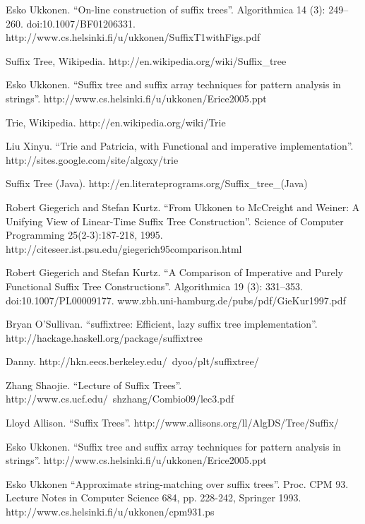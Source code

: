 \documentclass{article}
\begin{document}
\begin{thebibliography}{99}

Esko Ukkonen. ``On-line construction of suffix trees''. Algorithmica 14 (3): 249--260. doi:10.1007/BF01206331. http://www.cs.helsinki.fi/u/ukkonen/SuffixT1withFigs.pdf

Suffix Tree, Wikipedia. http://en.wikipedia.org/wiki/Suffix\_tree

Esko Ukkonen. ``Suffix tree and suffix array techniques for pattern analysis in strings''. http://www.cs.helsinki.fi/u/ukkonen/Erice2005.ppt

Trie, Wikipedia. http://en.wikipedia.org/wiki/Trie

Liu Xinyu. ``Trie and Patricia, with Functional and imperative implementation''. http://sites.google.com/site/algoxy/trie

Suffix Tree (Java). http://en.literateprograms.org/Suffix\_tree\_(Java)

Robert Giegerich and Stefan Kurtz. ``From Ukkonen to McCreight and Weiner: A Unifying View of Linear-Time Suffix Tree Construction''. Science of Computer Programming 25(2-3):187-218, 1995. http://citeseer.ist.psu.edu/giegerich95comparison.html

Robert Giegerich and Stefan Kurtz. ``A Comparison of Imperative and Purely Functional Suffix Tree Constructions''. Algorithmica 19 (3): 331--353. doi:10.1007/PL00009177. www.zbh.uni-hamburg.de/pubs/pdf/GieKur1997.pdf

Bryan O'Sullivan. ``suffixtree: Efficient, lazy suffix tree implementation''. http://hackage.haskell.org/package/suffixtree

Danny. http://hkn.eecs.berkeley.edu/~dyoo/plt/suffixtree/

Zhang Shaojie. ``Lecture of Suffix Trees''. http://www.cs.ucf.edu/~shzhang/Combio09/lec3.pdf

Lloyd Allison. ``Suffix Trees''. http://www.allisons.org/ll/AlgDS/Tree/Suffix/

Esko Ukkonen. ``Suffix tree and suffix array techniques for pattern analysis in strings''. http://www.cs.helsinki.fi/u/ukkonen/Erice2005.ppt

Esko Ukkonen ``Approximate string-matching over suffix trees''. Proc. CPM 93. Lecture Notes in Computer Science 684, pp. 228-242, Springer 1993. http://www.cs.helsinki.fi/u/ukkonen/cpm931.ps

\end{thebibliography}

\ifx\wholebook\relax \else
\end{document}
